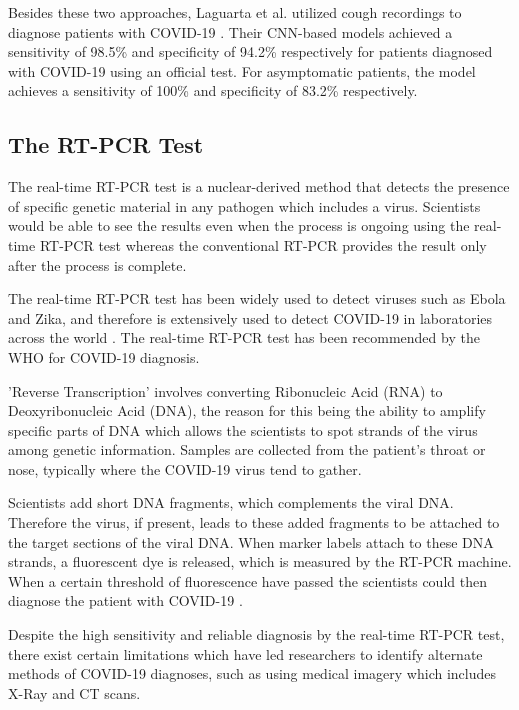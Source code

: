 Besides these two approaches, Laguarta et al. utilized cough recordings to diagnose patients with COVID-19 \cite{JFB2020}. Their CNN-based models achieved a sensitivity of 98.5\% and specificity of 94.2\% respectively for patients diagnosed with COVID-19 using an official test. For asymptomatic patients, the model achieves a sensitivity of 100\% and specificity of 83.2\% respectively. 

\subsection{The RT-PCR Test}
The real-time RT-PCR test is a nuclear-derived method that detects the presence of 
specific genetic material in any pathogen which includes a virus. Scientists would be able to see the results even when the process is ongoing
using the real-time RT-PCR test whereas the conventional RT-PCR provides the result 
only after the process is complete. 

The real-time RT-PCR test has been widely used to detect viruses such as Ebola 
and Zika, and therefore is extensively used to detect COVID-19 in 
laboratories across the world \cite{IAEA2020}. The real-time RT-PCR test 
has been recommended by the WHO for COVID-19 diagnosis.

'Reverse Transcription' involves converting Ribonucleic Acid (RNA) to  Deoxyribonucleic Acid (DNA), 
the reason for this being the ability to amplify specific parts of DNA which allows the scientists to 
spot strands of the virus among genetic information. Samples are collected from the patient's 
throat or nose, typically where the COVID-19 virus tend to gather.

Scientists add short DNA fragments, which 
complements the viral DNA. Therefore the virus, if present, 
leads to these added fragments to be attached to the 
target sections of the viral DNA. When marker labels attach to 
these DNA strands, a fluorescent dye is released, which is measured by 
the RT-PCR machine. When a certain threshold of fluorescence have passed the scientists could 
then diagnose the patient with 
COVID-19 \cite{IAEA2020}.

Despite the high sensitivity and reliable diagnosis by the real-time RT-PCR test, 
there exist certain limitations which have led researchers to identify alternate 
methods of COVID-19 diagnoses, such as using medical imagery which 
includes X-Ray and CT scans. 

